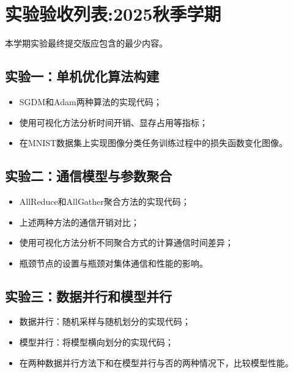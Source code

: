\chapter{实验验收列表:2025秋季学期}

本学期实验最终提交版应包含的最少内容。

\section{实验一：单机优化算法构建}
\begin{itemize}
    \item SGDM和Adam两种算法的实现代码；
    \item 使用可视化方法分析时间开销、显存占用等指标；
    \item 在MNIST数据集上实现图像分类任务训练过程中的损失函数变化图像。
\end{itemize}

\section{实验二：通信模型与参数聚合}
\begin{itemize}
    \item AllReduce和AllGather聚合方法的实现代码；
    \item 上述两种方法的通信开销对比；
    \item 使用可视化方法分析不同聚合方式的计算通信时间差异；
    \item 瓶颈节点的设置与瓶颈对集体通信和性能的影响。
\end{itemize}

\section{实验三：数据并行和模型并行}
\begin{itemize}
    \item 数据并行：随机采样与随机划分的实现代码；
    \item 模型并行：将模型横向划分的实现代码；
    \item 在两种数据并行方法下和在模型并行与否的两种情况下，比较模型性能。
\end{itemize}
